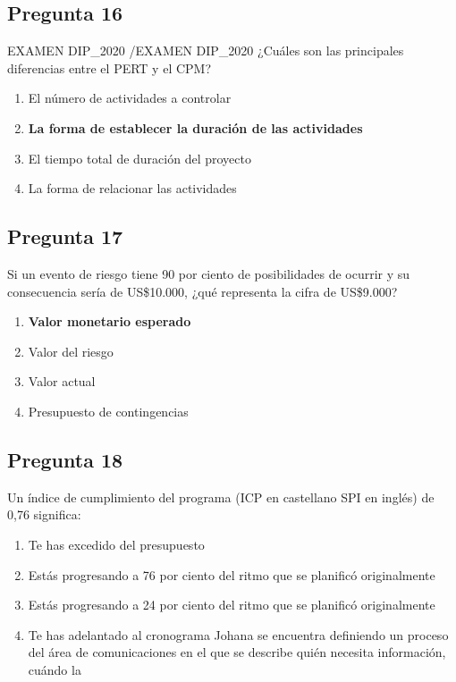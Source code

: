 \documentclass[11pt,a4paper]{article}
\begin{document}
\subsection*{Pregunta 16}
EXAMEN DIP\_2020 /EXAMEN DIP\_2020 ¿Cuáles son las principales diferencias entre el PERT y el CPM?

\begin{enumerate}[label=\alph*)]
  \item El número de actividades a controlar
  \item \textbf{La forma de establecer la duración de las actividades}
  \item El tiempo total de duración del proyecto
  \item La forma de relacionar las actividades
\end{enumerate}

\subsection*{Pregunta 17}
Si un evento de riesgo tiene 90 por ciento de posibilidades de ocurrir y su consecuencia sería de US\$10.000, ¿qué representa la cifra de US\$9.000?

\begin{enumerate}[label=\alph*)]
  \item \textbf{Valor monetario esperado}
  \item Valor del riesgo
  \item Valor actual
  \item Presupuesto de contingencias
\end{enumerate}

\subsection*{Pregunta 18}
Un índice de cumplimiento del programa (ICP en castellano SPI en inglés) de 0,76 significa:

\begin{enumerate}[label=\alph*)]
  \item Te has excedido del presupuesto
  \item Estás progresando a 76 por ciento del ritmo que se planificó originalmente
  \item Estás progresando a 24 por ciento del ritmo que se planificó originalmente
  \item Te has adelantado al cronograma Johana se encuentra definiendo un proceso del área de comunicaciones en el que se describe quién necesita información, cuándo la
\end{enumerate}
\end{document}
